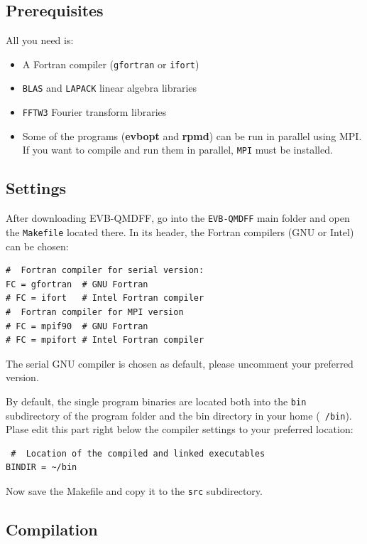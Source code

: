 \documentclass[12pt,a4paper]{scrartcl}
\begin{document}
\subsection{Prerequisites}

All you need is:

\begin{itemize}
 \item A Fortran compiler (\texttt{gfortran} or \texttt{ifort})
 \item \texttt{BLAS} and \texttt{LAPACK} linear algebra libraries
 \item \texttt{FFTW3} Fourier transform libraries 
 \item Some of the programs (\textbf{evbopt} and \textbf{rpmd}) can be run in parallel using MPI. 
 If you want to compile and run them in parallel, \texttt{MPI} must be installed.
\end{itemize}

\subsection{Settings}

After downloading EVB-QMDFF, go into the \texttt{EVB-QMDFF} main folder and open 
the \texttt{Makefile} located there.
In its header, the Fortran compilers (GNU or Intel) can be chosen:

\begin{verbatim}
#  Fortran compiler for serial version:
FC = gfortran  # GNU Fortran
# FC = ifort   # Intel Fortran compiler 
#  Fortran compiler for MPI version
# FC = mpif90  # GNU Fortran
# FC = mpifort # Intel Fortran compiler
\end{verbatim}

The serial GNU compiler is chosen as default, please uncomment your preferred version.

By default, the single program binaries are located both into the \texttt{bin} subdirectory 
of the program folder and the bin directory in your home (\texttt{~/bin}).
Plase edit this part right below the compiler settings to your preferred location:

\begin{verbatim}
 #  Location of the compiled and linked executables
BINDIR = ~/bin
\end{verbatim}


Now save the Makefile and copy it to the \texttt{src} subdirectory.

\subsection{Compilation}
\end{document}
